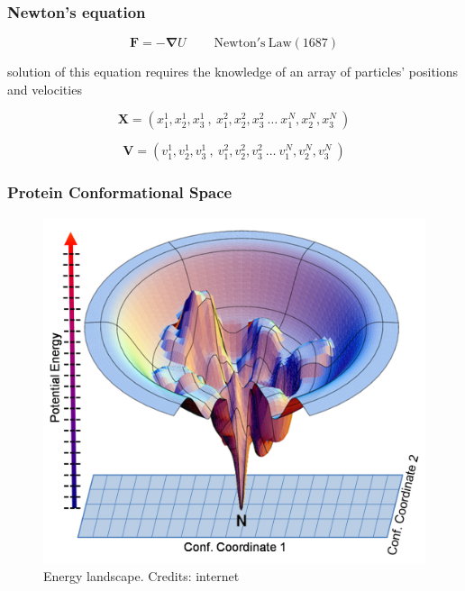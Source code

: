 \documentclass{beamer}
\begin{document}
\begin{frame}

\end{frame}


\begin{frame}
  \frametitle{Newton's equation}
  
  \begin{equation}
	  \mathbf{F}= - \mathbf{\nabla} U      \mathrm{~~~~~~~~~~Newton's~ Law (1687)}
  \end{equation}

  solution of this equation requires the knowledge of an array of
  particles' positions and velocities

  \begin{equation}
          \mathbf{X}= (x^1_1,x^1_2,x^1_3 ~,~ x^2_1,x^2_2,x^2_3 ~\ldots~ x^N_1,x^N_2,x^N_3~)
  \end{equation}


  \begin{equation}
          \mathbf{V}= (v^1_1,v^1_2,v^1_3~,~ v^2_1,v^2_2,v^2_3 ~\ldots~ v^N_1,v^N_2,v^N_3~)
  \end{equation}

\end{frame}


\begin{frame}\frametitle{Protein Conformational Space}

\begin{figure}
\includegraphics[scale=0.33]{landscape.png}
\caption{{\scriptsize Energy landscape. Credits: internet}}
\end{figure}

\end{frame}
\end{document}
